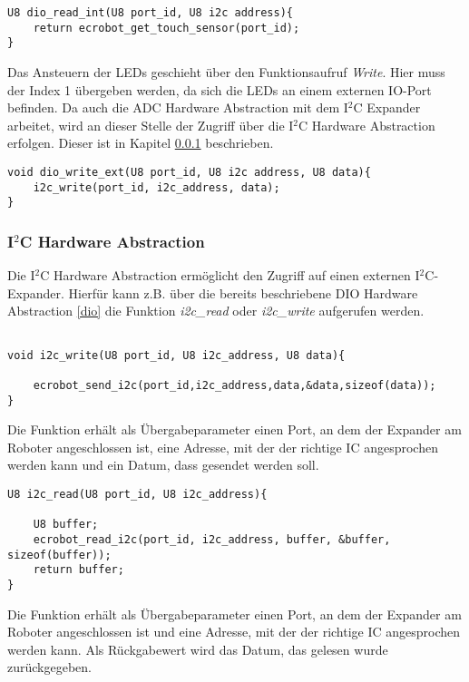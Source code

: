 \begin{lstlisting}[frame=single,caption={Aufruf der internen DIO-Read Funktion},captionpos=b]  
U8 dio_read_int(U8 port_id, U8 i2c address){
	return ecrobot_get_touch_sensor(port_id);
}
\end{lstlisting}
Das Ansteuern der LEDs geschieht über den Funktionsaufruf \textit{Write}. Hier muss der Index 1 übergeben werden, da sich die LEDs an einem externen IO-Port befinden. Da auch die ADC Hardware Abstraction mit dem I$^2$C Expander arbeitet, wird an dieser Stelle der Zugriff über die I$^2$C Hardware Abstraction erfolgen. Dieser ist in Kapitel \ref{i2cabstraction} beschrieben.

\begin{lstlisting}[frame=single,caption={Aufruf der I$^2$C Hardware Abstraction},captionpos=b]  
void dio_write_ext(U8 port_id, U8 i2c address, U8 data){
	i2c_write(port_id, i2c_address, data);
}
\end{lstlisting}
 

\subsubsection{I$^2$C Hardware Abstraction} \label{i2cabstraction}

Die I$^2$C Hardware Abstraction ermöglicht den Zugriff auf einen externen I$^2$C-Expander. Hierfür kann z.B. über die bereits beschriebene DIO Hardware Abstraction \ref{dio} die Funktion \textit{i2c\_read} oder \textit{i2c\_write}
aufgerufen werden.\\
\begin{lstlisting}[frame=single,caption={Aufruf der \textit{i2c\_write}-Funktion},captionpos=b]

void i2c_write(U8 port_id, U8 i2c_address, U8 data){
	
	ecrobot_send_i2c(port_id,i2c_address,data,&data,sizeof(data));
}
\end{lstlisting}
Die Funktion erhält als Übergabeparameter einen Port, an dem der Expander am Roboter angeschlossen ist, eine Adresse, mit der der richtige IC angesprochen werden kann und ein Datum, dass gesendet werden soll.\\
\begin{lstlisting}[frame=single,caption={Aufruf der \textit{i2c\_read}-Funktion},captionpos=b]  
U8 i2c_read(U8 port_id, U8 i2c_address){
	
	U8 buffer;
	ecrobot_read_i2c(port_id, i2c_address, buffer, &buffer, sizeof(buffer));
	return buffer;
}
\end{lstlisting}
Die Funktion erhält als Übergabeparameter einen Port, an dem der Expander am Roboter angeschlossen ist und eine Adresse, mit der der richtige IC angesprochen werden kann. Als Rückgabewert wird das Datum, das gelesen wurde zurückgegeben.


